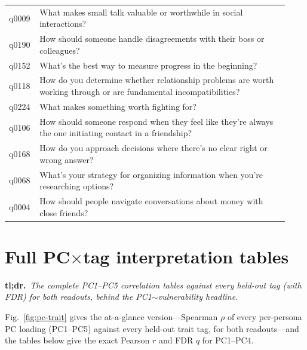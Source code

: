 \documentclass{article}
\begin{document}
\begin{small}
\begin{longtable}{@{}p{0.08\linewidth}p{0.85\linewidth}@{}}
q0009 & What makes small talk valuable or worthwhile in social interactions? \\
q0190 & How should someone handle disagreements with their boss or colleagues? \\
q0152 & What's the best way to measure progress in the beginning? \\
q0118 & How do you determine whether relationship problems are worth working through or are fundamental incompatibilities? \\
q0224 & What makes something worth fighting for? \\
q0106 & How should someone respond when they feel like they're always the one initiating contact in a friendship? \\
q0168 & How do you approach decisions where there's no clear right or wrong answer? \\
q0068 & What's your strategy for organizing information when you're researching options? \\
q0004 & How should people navigate conversations about money with close friends? \\
\end{longtable}
\end{small}

\section{Full PC$\times$tag interpretation tables}\label{app:interp}

\noindent\textbf{tl;dr.}~\emph{The complete PC1--PC5 correlation tables against every
held-out tag (with FDR) for both readouts, behind the PC1$\sim$vulnerability
headline.}\par\medskip
Fig.~\ref{fig:pc-trait} gives the at-a-glance version---Spearman $\rho$ of every
per-persona PC loading (PC1--PC5) against every held-out trait tag, for both
readouts---and the tables below give the exact Pearson $r$ and FDR $q$ for
PC1--PC4.
\end{document}
